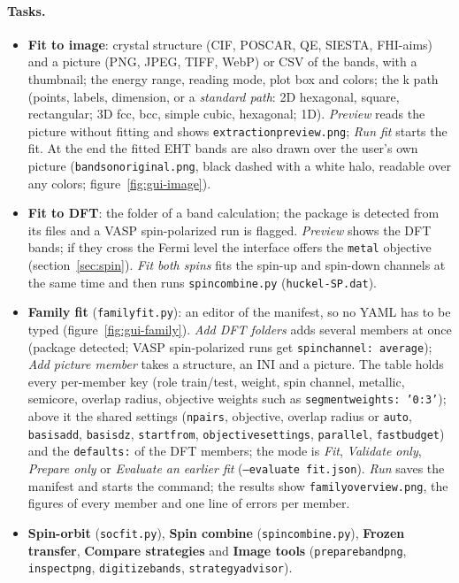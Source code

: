 \documentclass[11pt,a4paper]{article}
\newcommand{\cmd}[1]{\texttt{#1}}
\renewcommand{\_}{\origunderscore\allowbreak}
\begin{document}
\paragraph{Tasks.}
\begin{itemize}
  \item \textbf{Fit to image}: crystal structure (CIF, POSCAR, QE, SIESTA, FHI-aims) and a picture (PNG, JPEG, TIFF,
  WebP) or CSV of the bands, with a thumbnail; the energy range, reading mode, plot box and colors; the k path
  (points, labels, dimension, or a \emph{standard path}: 2D hexagonal, square, rectangular; 3D fcc, bcc, simple
  cubic, hexagonal; 1D). \emph{Preview} reads the picture without fitting and shows \cmd{extraction\_preview.png};
  \emph{Run fit} starts the fit. At the end the fitted EHT bands are also drawn over the user's own picture
  (\cmd{bands\_on\_original.png}, black dashed with a white halo, readable over any colors; figure~\ref{fig:gui-image}).
  \item \textbf{Fit to DFT}: the folder of a band calculation; the package is detected from its files and a VASP
  spin-polarized run is flagged. \emph{Preview} shows the DFT bands; if they cross the Fermi level the interface
  offers the \cmd{metal} objective (section~\ref{sec:spin}). \emph{Fit both spins} fits the spin-up and spin-down
  channels at the same time and then runs \cmd{spin\_combine.py} (\cmd{huckel-SP.dat}).
  \item \textbf{Family fit} (\cmd{family\_fit.py}): an editor of the manifest, so no YAML has to be typed
  (figure~\ref{fig:gui-family}). \emph{Add DFT folders} adds several members at once (package detected; VASP
  spin-polarized runs get \cmd{spin\_channel: average}); \emph{Add picture member} takes a structure, an INI and a
  picture. The table holds every per-member key (role train/test, weight, spin channel, metallic, semicore,
  overlap radius, objective weights such as \cmd{segment\_weights: '0:3'}); above it the shared settings
  (\cmd{n\_pairs}, objective, overlap radius or \cmd{auto}, \cmd{basis\_add}, \cmd{basis\_dz}, \cmd{start\_from},
  \cmd{objective\_settings}, \cmd{parallel}, \cmd{fast\_budget}) and the \cmd{defaults:} of the DFT members; the
  mode is \emph{Fit}, \emph{Validate only}, \emph{Prepare only} or \emph{Evaluate an earlier fit}
  (\cmd{--evaluate fit.json}). \emph{Run} saves the manifest and starts the command; the results show
  \cmd{family\_overview.png}, the figures of every member and one line of errors per member.
  \item \textbf{Spin-orbit} (\cmd{soc\_fit.py}), \textbf{Spin combine} (\cmd{spin\_combine.py}), \textbf{Frozen
  transfer}, \textbf{Compare strategies} and \textbf{Image tools} (\cmd{prepare\_band\_png},
  \cmd{inspect\_png}, \cmd{digitize\_bands}, \cmd{strategy\_advisor}).
\end{itemize}
\end{document}
